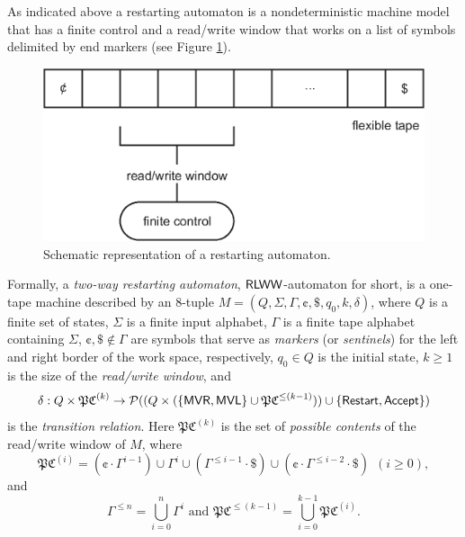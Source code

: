 As indicated above a restarting automaton is a nondeterministic machine model that has a finite control and a read/write window that works on a list of symbols delimited by end markers (see Figure \ref{figure:restarting_automaton}).

\begin{figure}[htp]
\centering
\includegraphics[scale=1.0]{img/restarting_automaton.eps}
\caption[Schematic representation of a restarting automaton.]
{Schematic representation of a restarting automaton.}
\label{figure:restarting_automaton}
\end{figure}

Formally, a \emph{two-way restarting automaton}, $\textup{\sf RLWW}$-automaton for short, is a one-tape machine described by an $8$-tuple $M = (Q, \Sigma, \Gamma, \cent, \$, q_0, k, \delta)$, where $Q$ is a finite set of states, $\Sigma$ is a finite input alphabet, $\Gamma$ is a finite tape alphabet containing $\Sigma$, \index{$\cent$}\index{$\$$}$\cent, \$ \notin \Gamma$ are symbols that serve as \emph{markers} (or \emph{sentinels}) for the left and right border of the work space, respectively, $q_0 \in Q$ is the initial state, $k \ge 1$ is the size of the \emph{read/write window}, and $$\delta: Q \times \mathfrak{PC}^{(k)} \to \mathcal{P}((Q \times (\{\textup{\sf MVR}, \textup{\sf MVL}\} \cup \mathfrak{PC}^{\le (k-1)})) \cup \{\textup{\sf Restart}, \textup{\sf Accept}\})$$ is the \emph{transition relation}. Here $\mathfrak{PC}^{(k)}$ is the set of \emph{possible contents} of the read/write window of $M$, where $$\mathfrak{PC}^{(i)} = (\cent \cdot \Gamma^{i-1}) \cup \Gamma^i \cup (\Gamma^{\le i-1} \cdot \$) \cup (\cent \cdot \Gamma^{\le i-2} \cdot \$)\ \ (i \ge 0),$$ and $$\Gamma^{\le n} = \bigcup_{i=0}^n \Gamma^i \text{ and } \mathfrak{PC}^{\le (k-1)} = \bigcup_{i=0}^{k-1}\mathfrak{PC}^{(i)}.$$

